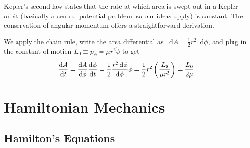 \documentclass[11pt, a4paper]{article}
\newcommand{\diff}{\mathop{}\!\mathrm{d}} %
\begin{document}
Kepler's second law states that the rate at which area is swept out in a Kepler orbit (basically a central potential problem, so our ideas apply) is constant. The conservation of angular momentum offers a straightforward derivation. 

We apply the chain rule, write the area differential as $ \diff A = \frac{1}{2} r^2 \diff \phi $, and plug in the constant of motion $ L_0 \equiv p_{\phi} = \mu r^2 \dot{\phi} $ to get
\begin{align*}
	\dv{A}{t} = \dv{A}{\phi} \dv{\phi}{t} = \frac{1}{2} \frac{r^2 \diff \phi}{\diff \phi} \dot{\phi} = \frac{1}{2} r^2 \left(\frac{L_0}{\mu r^2}\right) = \frac{L_0}{2\mu} 
\end{align*}
\fi

\section{Hamiltonian Mechanics} \label{sec:hamilton}

\subsection{Hamilton's Equations}
\end{document}
